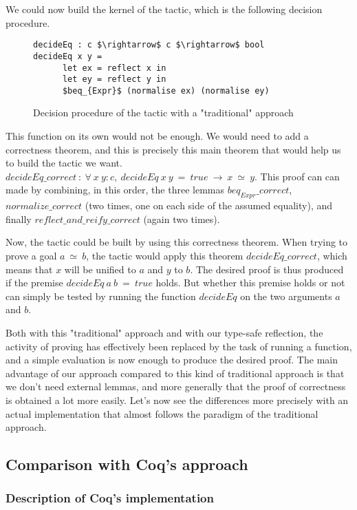 We could now build the kernel of the tactic, which is the following decision procedure. 
\begin{figure}[H]
\figrule
\begin{center}
\begin{lstlisting}
decideEq : c $\rightarrow$ c $\rightarrow$ bool 
decideEq x y =
      let ex = reflect x in 
      let ey = reflect y in
      $beq_{Expr}$ (normalise ex) (normalise ey)
\end{lstlisting}
\end{center}
\caption{Decision procedure of the tactic with a "traditional" approach}
\figrule
\end{figure}
This function on its own would not  be enough. We would need to add a correctness theorem, and this is precisely this main theorem that would help us to build the tactic we want.	
$decideEq\_correct\ :\ \forall\  x\ y:c,\ decideEq\ x\ y\ =\ true\ \rightarrow\ x\  \simeq\ y$. This proof can can made by combining, in this order, the three lemmas $beq_{Expr}\_correct$, $normalize\_correct$ (two times, one on each side of the assumed equality), and finally $reflect\_and\_reify\_correct$ (again two times).

Now, the tactic could be built by using this correctness theorem. When trying to prove a goal $a\ \simeq \ b$, the tactic would apply this theorem $decideEq\_correct$, which means that $x$ will be unified to $a$ and $y$ to $b$. The desired proof is thus produced if the premise $decideEq\ a\ b\ =\ true$ holds. But whether this premise holds or not can simply be tested by running the function $decideEq$ on the two arguments $a$ and $b$. 

Both with this "traditional" approach and with our type-safe reflection, the activity of proving has effectively been replaced by the task of running a function, and a simple evaluation is now enough to produce the desired proof. The main advantage of our approach compared to this kind of traditional approach is that we don't need external lemmas, and more generally that the proof of correctness is obtained a lot more easily. Let's now see the differences more precisely with an actual implementation that almost follows the paradigm of the traditional approach.

	\subsection {Comparison with Coq's approach}
	
		\subsubsection{Description of Coq's implementation}	
	
